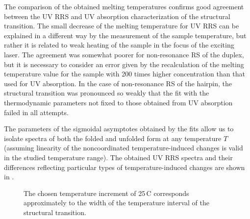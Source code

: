 \begin{table}
	\centering
	
	\caption[%
		Melting temperatures determined by the fit of the four relevant PCA
		scores.
	]{
		Remark: * Non-resonant RS was measured in $200\times$ higher concentration
		then UV absorption and UV RRS.
		Increased concentration increases the melting temperature for the
		bimolecular reaction of the duplex dissociation.
		The thermodynamic parameters determined from UV absorption data predict a
		melting temperature of 73\,\textdegree{}C for this high concentration.}
	\label{\tablabel{dna_hairpins:melting_temperatures}}
\end{table}

The comparison of the obtained melting temperatures confirms good agreement
between the UV RRS and UV absorption characterization of the structural
transition.
The small decrease of the melting temperature for UV RRS can be explained in a
different way by the measurement of the sample temperature, but rather it is
related to weak heating of the sample in the focus of the exciting laser.
The agreement was somewhat poorer for non-resonance RS of the duplex, but it is
necessary to consider an error given by the recalculation of the melting
temperature value for the sample with 200 times higher concentration than that
used for UV absorption.
In the case of non-resonance RS of the hairpin, the structural transition was
pronounced so weakly that the fit with the thermodynamic parameters not fixed
to those obtained from UV absorption failed in all attempts.

The parameters of the sigmoidal asymptotes obtained by the fits allow us to
isolate spectra of both the folded and unfolded form at any temperature $T$
(assuming linearity of the noncoordinated temperature-induced changes is valid
in the studied temperature range).
The obtained UV RRS spectra and their differences reflecting particular types
of temperature-induced changes are shown in
.

\begin{figure}
	\centering
	\caption[%
		Isolated UV RRS spectra of the folded and unfolded form at several
		temperatures and their differences corresponding to the spectral changes
		caused by the structural transition from the folded to the unfolded form
		(melting) and those caused by a temperature increase when the structural
		form is maintained.
	]{%
		The chosen temperature increment of 25\,\textdegree{}C corresponds
		approximately to the width of the temperature interval of the structural
		transition.
	}
	\label{\figlabel{dna_hairpins:forms_spectra}}
\end{figure}

